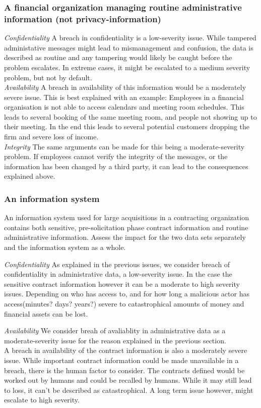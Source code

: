 \documentclass{article}
\begin{document}
\subsubsection{A financial organization managing routine administrative information (not privacy-information)}
\emph{Confidentiality}
A breach in confidentiality is a low-severity issue. While tampered administative messages might lead
to mismanagement and confusion, the data is described as routine and any tampering would likely
be caught before the problem escalates. In extreme cases, it might be escalated to a medium severity 
problem, but not by default.\\

\emph{Availability}
A breach in availability of this information would be a moderately severe issue. 
This is best explained with an example: Employees in a financial organisation is not
able to access calendars and meeting room schedules. This leads to several booking of
the same meeting room, and people not showing up to their meeting. In the end this
leads to several potential customers dropping the firm and severe loss of income.\\

\emph{Integrity}
The same arguments can be made for this being a moderate-severity problem. If
employees cannot verify the integrity of the messages, or the information has
been changed by a third party, it can lead to the consequences explained above.\\

\subsubsection{An information system}
An information system used for large acquisitions in a contracting organization contains both sensitive, pre-solicitation phase contract information and routine administrative information. Assess the impact for the two data sets separately and the information system as a whole.


\emph{Confidentiality}
As explained in the previous issues, we consider breach of confidentiality in administrative data, a
low-severity issue. In the case the sensitive contract information however
it can be a moderate to high severity issues. Depending on who has access to,
and for how long a malicious actor has access(minutes? days? years?) severe
to catastrophical amounts of money and financial assets can be lost.

\emph{Availability}
We consider breah of avaliablity in administrative data as a moderate-severity issue for the reason explained in the previous section. \\
A breach in availability of the contract information is also a moderately
severe issue. While important contract information could be made unavailable
in a breach, there is the human factor to consider. The contracts defined
would be worked out by humans and could be recalled by humans. While it may
still lead to loss, it can't be described as catastrophical. A long term 
issue however, might escalate to high severity.
\end{document}
